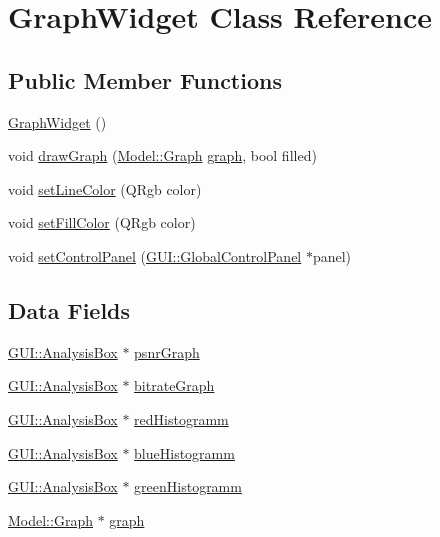 \hypertarget{classGUI_1_1GraphWidget}{}\section{Graph\+Widget Class Reference}
\label{classGUI_1_1GraphWidget}
\subsection*{Public Member Functions}
\begin{DoxyCompactItemize}
\item 
\hyperlink{classGUI_1_1GraphWidget_a6d80d51caf0aee4c148baee49978f8c3}{Graph\+Widget} ()
\item 
void \hyperlink{classGUI_1_1GraphWidget_a25c17e8ca0168048e36c347f423ed017}{draw\+Graph} (\hyperlink{classModel_1_1Graph}{Model\+::\+Graph} \hyperlink{classGUI_1_1GraphWidget_ab3ea51551e457dd2373457329db2651e}{graph}, bool filled)
\item 
void \hyperlink{classGUI_1_1GraphWidget_ac7a4a8dd961c4b9c732ef22bfb4143ce}{set\+Line\+Color} (Q\+Rgb color)
\item 
void \hyperlink{classGUI_1_1GraphWidget_a7d8af579d2c285a372ec5bc60cbac4c1}{set\+Fill\+Color} (Q\+Rgb color)
\item 
void \hyperlink{classGUI_1_1GraphWidget_a7b9e0f55d4f00ec543cc714478104c80}{set\+Control\+Panel} (\hyperlink{classGUI_1_1GlobalControlPanel}{G\+U\+I\+::\+Global\+Control\+Panel} $\ast$panel)
\end{DoxyCompactItemize}
\subsection*{Data Fields}
\begin{DoxyCompactItemize}
\item 
\hyperlink{classGUI_1_1AnalysisBox}{G\+U\+I\+::\+Analysis\+Box} $\ast$ \hyperlink{classGUI_1_1GraphWidget_a8eb06e20b4d45dae183529cdbcfccd37}{psnr\+Graph}
\item 
\hyperlink{classGUI_1_1AnalysisBox}{G\+U\+I\+::\+Analysis\+Box} $\ast$ \hyperlink{classGUI_1_1GraphWidget_a0820983260f94179618b2d20660fccb8}{bitrate\+Graph}
\item 
\hyperlink{classGUI_1_1AnalysisBox}{G\+U\+I\+::\+Analysis\+Box} $\ast$ \hyperlink{classGUI_1_1GraphWidget_abbcef0fcdc2fe6a2fcf4f1c7dc894616}{red\+Histogramm}
\item 
\hyperlink{classGUI_1_1AnalysisBox}{G\+U\+I\+::\+Analysis\+Box} $\ast$ \hyperlink{classGUI_1_1GraphWidget_ae1216a2a17f8e93ec56dadca439499e2}{blue\+Histogramm}
\item 
\hyperlink{classGUI_1_1AnalysisBox}{G\+U\+I\+::\+Analysis\+Box} $\ast$ \hyperlink{classGUI_1_1GraphWidget_a262e4b4b63ed00cb7e29d0e80096cc48}{green\+Histogramm}
\item 
\hyperlink{classModel_1_1Graph}{Model\+::\+Graph} $\ast$ \hyperlink{classGUI_1_1GraphWidget_ab3ea51551e457dd2373457329db2651e}{graph}
\end{DoxyCompactItemize}
